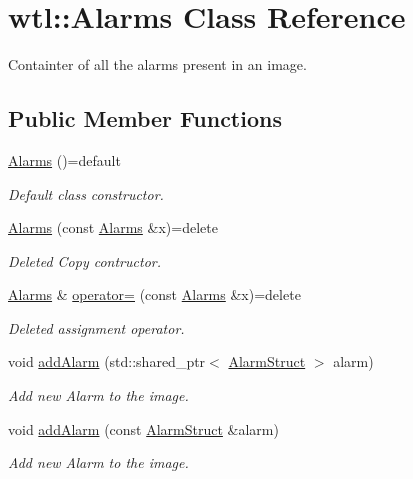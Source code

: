 \hypertarget{classwtl_1_1_alarms}{}\section{wtl\+:\+:Alarms Class Reference}
\label{classwtl_1_1_alarms}


Containter of all the alarms present in an image.  


\subsection*{Public Member Functions}
\begin{DoxyCompactItemize}
\item 
\hyperlink{classwtl_1_1_alarms_a4dfc7136cef92ed082180b489066ff27}{Alarms} ()=default
\begin{DoxyCompactList}\small\item\em Default class constructor. \end{DoxyCompactList}\item 
\hyperlink{classwtl_1_1_alarms_ade2ecfbc7e1578619fe579cdcb2b0dd0}{Alarms} (const \hyperlink{classwtl_1_1_alarms}{Alarms} \&x)=delete
\begin{DoxyCompactList}\small\item\em Deleted Copy contructor. \end{DoxyCompactList}\item 
\hyperlink{classwtl_1_1_alarms}{Alarms} \& \hyperlink{classwtl_1_1_alarms_ac110daa351bdd500a2a858657751cef9}{operator=} (const \hyperlink{classwtl_1_1_alarms}{Alarms} \&x)=delete
\begin{DoxyCompactList}\small\item\em Deleted assignment operator. \end{DoxyCompactList}\item 
void \hyperlink{classwtl_1_1_alarms_a6f79d51d6a2b87856f780b0fa19c80de}{add\+Alarm} (std\+::shared\+\_\+ptr$<$ \hyperlink{structwtl_1_1_alarm_struct}{Alarm\+Struct} $>$ alarm)
\begin{DoxyCompactList}\small\item\em Add new Alarm to the image. \end{DoxyCompactList}\item 
void \hyperlink{classwtl_1_1_alarms_af3ec2625ea7bf5b6e78a25a7728f5c1c}{add\+Alarm} (const \hyperlink{structwtl_1_1_alarm_struct}{Alarm\+Struct} \&alarm)
\begin{DoxyCompactList}\small\item\em Add new Alarm to the image. \end{DoxyCompactList}\item 

\end{DoxyCompactItemize}
